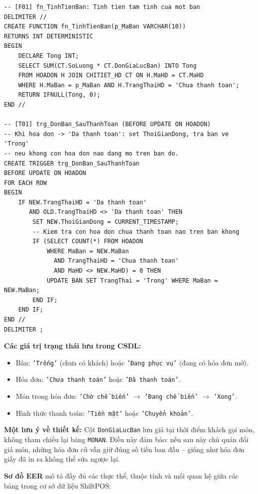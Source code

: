 \documentclass[12pt,a4paper]{report}
\newcommand{\code}[1]{\texttt{#1}}
\begin{document}
\begin{lstlisting}[style=mysql,
  caption={File \texttt{ChucNang.sql} -- Hàm \texttt{fn\_TinhTienBan} và Trigger \texttt{trg\_DonBan\_SauThanhToan}},
  label=lst:sql-trigger]
-- [F01] fn_TinhTienBan: Tinh tien tam tinh cua mot ban
DELIMITER //
CREATE FUNCTION fn_TinhTienBan(p_MaBan VARCHAR(10))
RETURNS INT DETERMINISTIC
BEGIN
    DECLARE Tong INT;
    SELECT SUM(CT.SoLuong * CT.DonGiaLucBan) INTO Tong
    FROM HOADON H JOIN CHITIET_HD CT ON H.MaHD = CT.MaHD
    WHERE H.MaBan = p_MaBan AND H.TrangThaiHD = 'Chua thanh toan';
    RETURN IFNULL(Tong, 0);
END //

-- [T01] trg_DonBan_SauThanhToan (BEFORE UPDATE ON HOADON)
-- Khi hoa don -> 'Da thanh toan': set ThoiGianDong, tra ban ve 'Trong'
-- neu khong con hoa don nao dang mo tren ban do.
CREATE TRIGGER trg_DonBan_SauThanhToan
BEFORE UPDATE ON HOADON
FOR EACH ROW
BEGIN
    IF NEW.TrangThaiHD = 'Da thanh toan'
       AND OLD.TrangThaiHD <> 'Da thanh toan' THEN
        SET NEW.ThoiGianDong = CURRENT_TIMESTAMP;
        -- Kiem tra con hoa don chua thanh toan nao tren ban khong
        IF (SELECT COUNT(*) FROM HOADON
            WHERE MaBan = NEW.MaBan
              AND TrangThaiHD = 'Chua thanh toan'
              AND MaHD <> NEW.MaHD) = 0 THEN
            UPDATE BAN SET TrangThai = 'Trong' WHERE MaBan = NEW.MaBan;
        END IF;
    END IF;
END //
DELIMITER ;
\end{lstlisting}

\textbf{Các giá trị trạng thái lưu trong CSDL:}
\begin{itemize}
  \item Bàn: \code{'Trống'} (chưa có khách) hoặc \code{'Đang phục vụ'} (đang có hóa đơn mở).
  \item Hóa đơn: \code{'Chưa thanh toán'} hoặc \code{'Đã thanh toán'}.
  \item Món trong hóa đơn: \code{'Chờ chế biến'} $\rightarrow$ \code{'Đang chế biến'} $\rightarrow$ \code{'Xong'}.
  \item Hình thức thanh toán: \code{'Tiền mặt'} hoặc \code{'Chuyển khoản'}.
\end{itemize}

\textbf{Một lưu ý về thiết kế:} Cột \code{DonGiaLucBan} lưu giá tại thời điểm khách gọi món, không tham chiếu lại bảng \code{MONAN}. Điều này đảm bảo: nếu sau này chủ quán đổi giá món, những hóa đơn cũ vẫn giữ đúng số tiền ban đầu -- giống như hóa đơn giấy đã in ra không thể sửa ngược lại.

\textbf{Sơ đồ EER} mô tả đầy đủ các thực thể, thuộc tính và mối quan hệ giữa các bảng trong cơ sở dữ liệu ShiftPOS:
\end{document}
